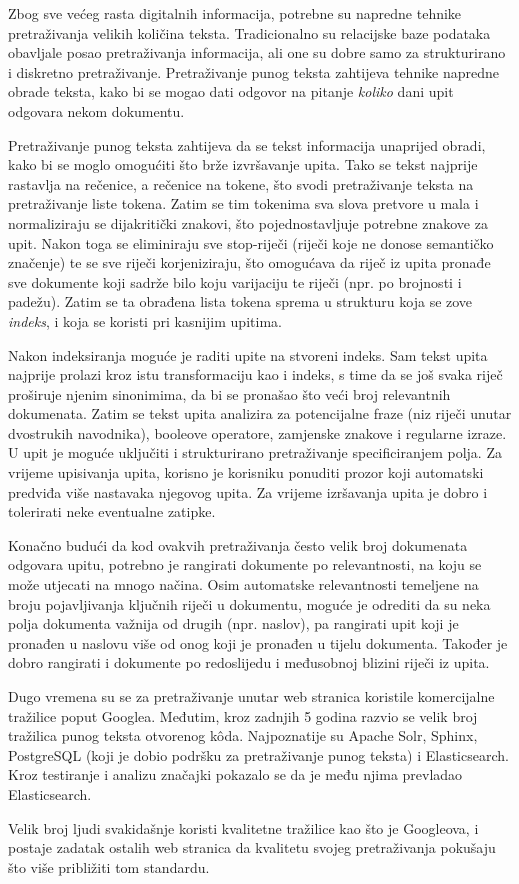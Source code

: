 \documentclass[a4paper,twoside,12pt]{scrreprt}
\begin{document}
\begin{sazetak}
  Zbog sve većeg rasta digitalnih informacija, potrebne su napredne tehnike pretraživanja velikih količina teksta. Tradicionalno su relacijske baze podataka obavljale posao pretraživanja informacija, ali one su dobre samo za strukturirano i diskretno pretraživanje. Pretraživanje punog teksta zahtijeva tehnike napredne obrade teksta, kako bi se mogao dati odgovor na pitanje \textit{koliko} dani upit odgovara nekom dokumentu.

  Pretraživanje punog teksta zahtijeva da se tekst informacija unaprijed obradi, kako bi se moglo omogućiti što brže izvršavanje upita. Tako se tekst najprije rastavlja na rečenice, a rečenice na tokene, što svodi pretraživanje teksta na pretraživanje liste tokena. Zatim se tim tokenima sva slova pretvore u mala i normaliziraju se dijakritički znakovi, što pojednostavljuje potrebne znakove za upit. Nakon toga se eliminiraju sve stop-riječi (riječi koje ne donose semantičko značenje) te se sve riječi korjeniziraju, što omogućava da riječ iz upita pronađe sve dokumente koji sadrže bilo koju varijaciju te riječi (npr. po brojnosti i padežu). Zatim se ta obrađena lista tokena sprema u strukturu koja se zove \textit{indeks}, i koja se koristi pri kasnijim upitima.

  Nakon indeksiranja moguće je raditi upite na stvoreni indeks. Sam tekst upita najprije prolazi kroz istu transformaciju kao i indeks, s time da se još svaka riječ proširuje njenim sinonimima, da bi se pronašao što veći broj relevantnih dokumenata. Zatim se tekst upita analizira za potencijalne fraze (niz riječi unutar dvostrukih navodnika), booleove operatore, zamjenske znakove i regularne izraze. U upit je moguće uključiti i strukturirano pretraživanje specificiranjem polja. Za vrijeme upisivanja upita, korisno je korisniku ponuditi prozor koji automatski predviđa više nastavaka njegovog upita. Za vrijeme izršavanja upita je dobro i tolerirati neke eventualne zatipke.

  Konačno budući da kod ovakvih pretraživanja često velik broj dokumenata odgovara upitu, potrebno je rangirati dokumente po relevantnosti, na koju se može utjecati na mnogo načina. Osim automatske relevantnosti temeljene na broju pojavljivanja ključnih riječi u dokumentu, moguće je odrediti da su neka polja dokumenta važnija od drugih (npr. naslov), pa rangirati upit koji je pronađen u naslovu više od onog koji je pronađen u tijelu dokumenta. Također je dobro rangirati i dokumente po redoslijedu i međusobnoj blizini riječi iz upita.

  Dugo vremena su se za pretraživanje unutar web stranica koristile komercijalne tražilice poput Googlea. Međutim, kroz zadnjih 5 godina razvio se velik broj tražilica punog teksta otvorenog kôda. Najpoznatije su Apache Solr, Sphinx, PostgreSQL (koji je dobio podršku za pretraživanje punog teksta) i Elasticsearch. Kroz testiranje i analizu značajki pokazalo se da je među njima prevladao Elasticsearch.

  Velik broj ljudi svakidašnje koristi kvalitetne tražilice kao što je Googleova, i postaje zadatak ostalih web stranica da kvalitetu svojeg pretraživanja pokušaju što više približiti tom standardu.
\end{sazetak}
\end{document}
